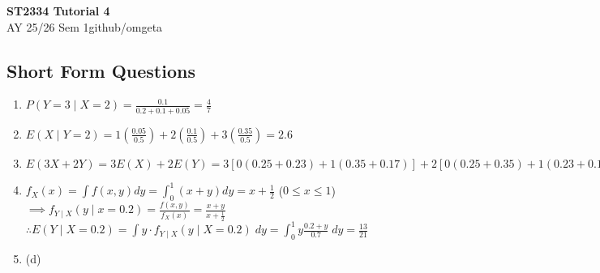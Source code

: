 \documentclass[12pt, a4paper]{article}
\newcommand{\mytitle}{ST2334 Tutorial 4}
\newcommand{\myauthor}{github/omgeta}
\newcommand{\mydate}{AY 25/26 Sem 1}
\begin{document}
\raggedright
\footnotesize
\begin{center}
{\normalsize{\textbf{\mytitle}}} \\
{\footnotesize{\mydate\hspace{2pt}\textemdash\hspace{2pt}\myauthor}}
\end{center}
\subsection*{Short Form Questions}
\begin{enumerate}[Q\arabic*.]
  \item $P(Y=3\mid X=2) = \frac{0.1}{0.2 + 0.1+ 0.05} = \frac{4}{7}$ 

  \item $E(X\mid Y = 2) = 1(\frac{0.05}{0.5}) + 2(\frac{0.1}{0.5}) + 3(\frac{0.35}{0.5}) = 2.6$ 

  \item $E(3X+2Y) = 3E(X) + 2E(Y) = 3[0(0.25 + 0.23) + 1(0.35 + 0.17)] + 2[0(0.25+0.35) + 1(0.23 + 0.17)] = 2.36$ 

  \item $\displaystyle f_X(x) = \int f(x,y)dy = \int^1_0 (x+y) dy = x + \frac{1}{2}$ ($0 \leq x \leq 1$)\\
    $\displaystyle \implies f_{Y\mid X}(y \mid x = 0.2)= \frac{f(x, y)}{f_X(x)}= \frac{x+y}{x+\frac{1}{2}}$\\
    $\therefore \displaystyle E(Y\mid X=0.2) = \int y \cdot f_{Y\mid X}(y\mid X=0.2)\;dy = \int^1_0 y \frac{0.2+y}{0.7}\;dy = \frac{13}{21}$

  \item (d) 
\end{enumerate}
\end{document}
